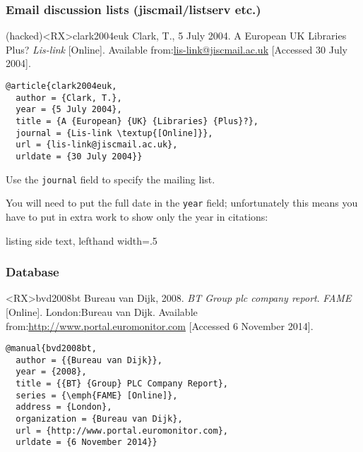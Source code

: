 \documentclass[10pt,a4paper]{article}
\newenvironment{tips}{%
  \begin{list}{\makebox[2em][c]{\faLightbulbO}}{%
    \setlength{\leftmargin}{2em}
    \setlength{\labelwidth}{2em}
    \setlength{\labelsep}{0pt}}
}{\end{list}}
\newenvironment{hacks}{%
  \begin{list}{\makebox[2em][c]{\faWrench}}{%
    \setlength{\leftmargin}{2em}
    \setlength{\labelwidth}{2em}
    \setlength{\labelsep}{0pt}}
}{\end{list}}
\begin{document}
\subsubsection*{Email discussion lists (jiscmail\slash listserv etc.)}

\begin{bibexbox}(hacked)<RX>{clark2004euk}
  Clark, T., 5 July 2004. A European UK Libraries Plus? \emph{Lis-link} [Online]. Available from:\@ \url{lis-link@jiscmail.ac.uk} [Accessed 30 July 2004].
  \tcblower
\begin{Verbatim}
@article{clark2004euk,
  author = {Clark, T.},
  year = {5 July 2004},
  title = {A {European} {UK} {Libraries} {Plus}?},
  journal = {Lis-link \textup{[Online]}},
  url = {lis-link@jiscmail.ac.uk},
  urldate = {30 July 2004}}
\end{Verbatim}
\end{bibexbox}

\begin{tips}
\item Use the \texttt{journal} field to specify the mailing list.
\end{tips}

\begin{hacks}
\item You will need to put the full date in the \texttt{year} field;
unfortunately this means you have to put in extra work to show only the year in citations:
\end{hacks}

\begin{tcblisting}{listing side text, lefthand width=.5\linewidth}
\citetext{\citeauthor[2004]{clark2004euk}}
\end{tcblisting}

\subsubsection*{Database}

\begin{bibexbox}<RX>{bvd2008bt}
  Bureau van Dijk, 2008. \emph{BT Group plc company report}. \emph{FAME} [Online]. London:\@ Bureau van Dijk. Available from:\@ \url{http://www.portal.euromonitor.com} [Accessed 6 November 2014].
  \tcblower
\begin{Verbatim}
@manual{bvd2008bt,
  author = {{Bureau van Dijk}},
  year = {2008},
  title = {{BT} {Group} PLC Company Report},
  series = {\emph{FAME} [Online]},
  address = {London},
  organization = {Bureau van Dijk},
  url = {http://www.portal.euromonitor.com},
  urldate = {6 November 2014}}
\end{Verbatim}
\end{bibexbox}
\end{document}
